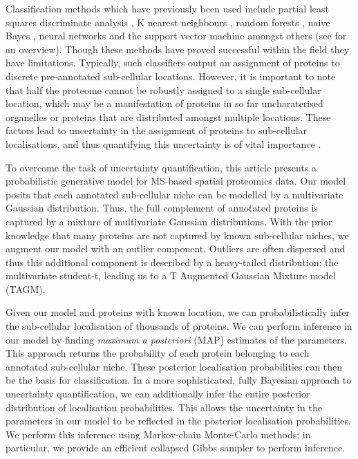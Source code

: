 \documentclass[12pt,english]{article}\usepackage[]{graphicx}\usepackage[]{color}
\begin{document}
Classification methods which have previously been used include partial
least squares discriminate analysis \citep{Dunkley:2006}, K nearest
neighbours \citep{Groen::2014}, random forests \citep{Ohta::2010},
naive Bayes \citep{Nikolovski::2012}, neural networks
\citep{Tardif::2012} and the support vector machine amongst others
(see \cite{Gatto:2014b} for an overview). Though these methods have
proved successful within the field they have limitations. Typically,
such classifiers output an assignment of proteins to discrete
pre-annotated sub-cellular locations. However, it is important to note
that half the proteome cannot be robustly assigned to a single
sub-cellular location, which may be a manifestation of proteins in so
far uncharaterised organelles or proteins that are distributed amongst
multiple locations. These factors lead to uncertainty in the
assignment of proteins to sub-cellular localisations, and thus
quantifying this uncertainty is of vital importance \citep{Kirk:2015}.

To overcome the task of uncertainty quantification, this article
presents a probabilistic generative model for MS-based spatial
proteomics data. Our model posits that each annotated sub-cellular
niche can be modelled by a multivariate Gaussian distribution. Thus,
the full complement of annotated proteins is captured by a mixture of
multivariate Gaussian distributions. With the prior knowledge that
many proteins are not captured by known sub-cellular niches, we
augment our model with an outlier component. Outliers are often
dispersed and thus this additional component is described by a
heavy-tailed distribution: the multivariate student-t, leading us to a
T Augmented Gaussian Mixture model (TAGM).

Given our model and proteins with known location, we can
probabilistically infer the sub-cellular localisation of thousands of
proteins. We can perform inference in our model by finding
\textit{maximum a posteriori} (MAP) estimates of the parameters. This
approach returns the probability of each protein belonging to each
annotated sub-cellular niche. These posterior localisation
probabilities can then be the basis for classification. In a more
sophisticated, fully Bayesian approach to uncertainty quantification,
we can additionally infer the entire posterior distribution of
localisation probabilities. This allows the uncertainty in the
parameters in our model to be reflected in the posterior localisation
probabilities. We perform this inference using Markov-chain
Monte-Carlo methods; in particular, we provide an efficient collapsed
Gibbs sampler to perform inference.
\end{document}
